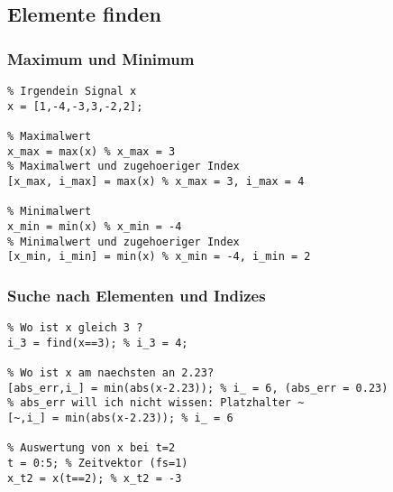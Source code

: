 \documentclass[threecolumn, 5pt, german]{latex4ei/latex4ei_sheet}
\begin{document}
	\begin{sectionbox}
	
		\subsection{Elemente finden}
		
		\subsubsection{Maximum und Minimum}
		
		\begin{lstlisting}
% Irgendein Signal x
x = [1,-4,-3,3,-2,2];

% Maximalwert
x_max = max(x) % x_max = 3
% Maximalwert und zugehoeriger Index
[x_max, i_max] = max(x) % x_max = 3, i_max = 4

% Minimalwert
x_min = min(x) % x_min = -4
% Minimalwert und zugehoeriger Index
[x_min, i_min] = min(x) % x_min = -4, i_min = 2
		\end{lstlisting}

		\subsubsection{Suche nach Elementen und Indizes}
		
		\begin{lstlisting}
% Wo ist x gleich 3 ?
i_3 = find(x==3); % i_3 = 4;

% Wo ist x am naechsten an 2.23?
[abs_err,i_] = min(abs(x-2.23)); % i_ = 6, (abs_err = 0.23)
% abs_err will ich nicht wissen: Platzhalter ~
[~,i_] = min(abs(x-2.23)); % i_ = 6

% Auswertung von x bei t=2
t = 0:5; % Zeitvektor (fs=1)
x_t2 = x(t==2); % x_t2 = -3
		\end{lstlisting}
	\end{sectionbox}
	
\end{document}
